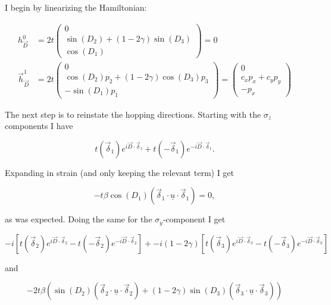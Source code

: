 \documentclass[../../../main.tex]{subfiles}
\begin{document}
I begin by linearizing the Hamiltonian: 

\begin{align}
	h_{\vec{D}}^0 &= 2t
	\begin{pmatrix}
		0 \\
		\sin(D_2) + (1-2\gamma)\sin(D_3) \\
		\cos(D_1) 
	\end{pmatrix}  = 0\\
	\vec{h}_{\vec{D}}^1 &= 2t 
	\begin{pmatrix}
		0 \\
		\cos(D_2)p_2 + (1-2\gamma)\cos(D_3)p_3 \\
		-\sin(D_1)p_1
	\end{pmatrix} = 
	\begin{pmatrix}
		0 \\
		c_x p_x + c_y p_y \\
		-p_x
	\end{pmatrix}
\end{align}	

The next step is to reinstate the hopping directions. Starting with the $\sigma_z$ components I have 

\begin{equation}
	t(\vec{\delta}_1)e^{i\vec{D}\cdot\vec{\delta}_1} + t(-\vec{\delta}_1)e^{-i\vec{D}\cdot\vec{\delta}_1}.
\end{equation}

Expanding in strain (and only keeping the relevant term) I get

\begin{equation}
	-t\beta \cos(D_1) \left( \vec{\delta}_1 \cdot \underline{u} \cdot \vec{\delta}_1\right) = 0,
\end{equation}

as was expected. Doing the same for the $\sigma_y$-component I get

\begin{equation}
	-i\left[t(\vec{\delta}_2)e^{i\vec{D}\cdot\vec{\delta}_2} - t(-\vec{\delta}_2)e^{-i\vec{D}\cdot\vec{\delta}_2}\right] + -i(1-2\gamma)\left[ t(\vec{\delta}_3)e^{i\vec{D}\cdot\vec{\delta}_3} - t(-\vec{\delta}_3)e^{-i\vec{D}\cdot\vec{\delta}_3} \right]
\end{equation}

and

\begin{equation}
	-2t\beta\left(\sin(D_2)\left(\vec{\delta}_2 \cdot \underline{u} \cdot \vec{\delta}_2\right)+ (1-2\gamma)\sin(D_3)\left( \vec{\delta}_3 \cdot \underline{u} \cdot \vec{\delta}_3\right)\right)
\end{equation}
\end{document}
